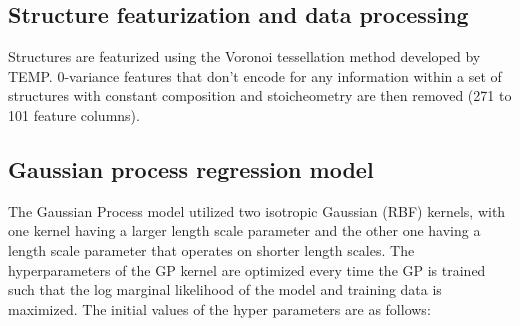 %




%
%
%



\subsection{Structure featurization and data processing}  %
%
Structures are featurized using the Voronoi tessellation method developed by TEMP.
%
0-variance features that don't encode for any information within a set of structures with constant composition and stoicheometry are then removed (\num{271} to \num{101} feature columns).


\subsection{Gaussian process regression model}  %
%
%
The Gaussian Process model utilized two isotropic Gaussian (RBF) kernels, with one kernel having a larger length scale parameter and the other one having a length scale parameter that operates on shorter length scales.
%
The hyperparameters of the GP kernel are optimized every time the GP is trained such that the log marginal likelihood of the model and training data is maximized.
%
The initial values of the hyper parameters are as follows:

